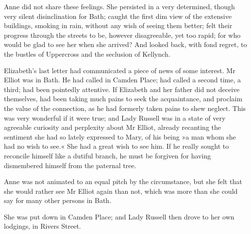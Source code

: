 Anne did not share these feelings. She persisted in a very determined, though very silent disinclination for Bath; caught the first dim view of the extensive buildings, smoking in rain, without any wish of seeing them better; felt their progress through the streets to be, however disagreeable, yet too rapid; for who would be glad to see her when she arrived? And looked back, with fond regret, to the bustles of Uppercross and the seclusion of Kellynch.

Elizabeth's last letter had communicated a piece of news of some interest. Mr Elliot was in Bath. He had called in Camden Place; had called a second time, a third; had been pointedly attentive. If Elizabeth and her father did not deceive themselves, had been taking much pains to seek the acquaintance, and proclaim the value of the connection, as he had formerly taken pains to shew neglect. This was very wonderful if it were true; and Lady Russell was in a state of very agreeable curiosity and perplexity about Mr Elliot, already recanting the sentiment she had so lately expressed to Mary, of his being »a man whom she had no wish to see.« She had a great wish to see him. If he really sought to reconcile himself like a dutiful branch, he must be forgiven for having dismembered himself from the paternal tree.

Anne was not animated to an equal pitch by the circumstance, but she felt that she would rather see Mr Elliot again than not, which was more than she could say for many other persons in Bath.

She was put down in Camden Place; and Lady Russell then drove to her own lodgings, in Rivers Street.
